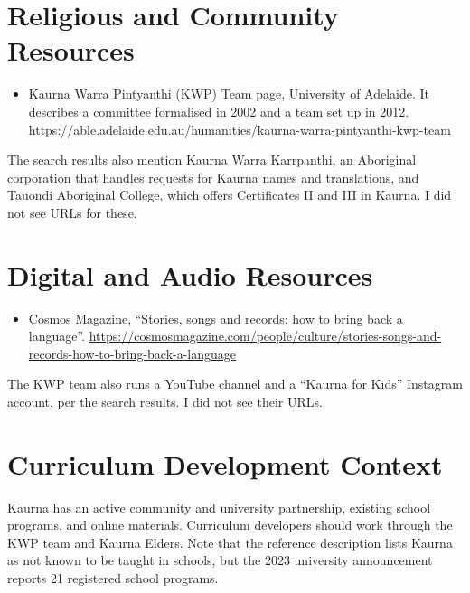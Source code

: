 \documentclass[12pt]{article}
\begin{document}
\section{Religious and Community Resources}
\begin{itemize}
\item Kaurna Warra Pintyanthi (KWP) Team page, University of Adelaide. It describes a committee formalised in 2002 and a team set up in 2012. \url{https://able.adelaide.edu.au/humanities/kaurna-warra-pintyanthi-kwp-team}
\end{itemize}
The search results also mention Kaurna Warra Karrpanthi, an Aboriginal corporation that handles requests for Kaurna names and translations, and Tauondi Aboriginal College, which offers Certificates II and III in Kaurna. I did not see URLs for these.

\section{Digital and Audio Resources}
\begin{itemize}
\item Cosmos Magazine, ``Stories, songs and records: how to bring back a language''. \url{https://cosmosmagazine.com/people/culture/stories-songs-and-records-how-to-bring-back-a-language}
\end{itemize}
The KWP team also runs a YouTube channel and a ``Kaurna for Kids'' Instagram account, per the search results. I did not see their URLs.

\section{Curriculum Development Context}
Kaurna has an active community and university partnership, existing school programs, and online materials. Curriculum developers should work through the KWP team and Kaurna Elders. Note that the reference description lists Kaurna as not known to be taught in schools, but the 2023 university announcement reports 21 registered school programs.
\end{document}
